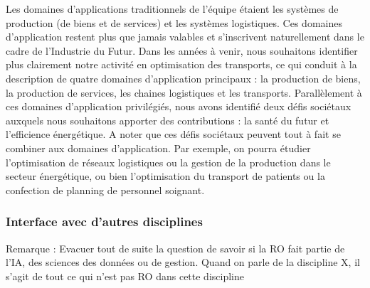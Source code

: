 	Les domaines d'applications traditionnels de l'équipe étaient les systèmes de production (de biens et de services) et les systèmes logistiques. 
	Ces domaines d'application restent plus que jamais valables et s'inscrivent naturellement dans le cadre de l'Industrie du Futur. 
	Dans les années à venir, nous souhaitons identifier plus clairement notre activité en optimisation des transports, ce qui conduit à la description de quatre domaines d'application principaux : la production de biens, la production de services, les chaines logistiques et les transports. Parallèlement à ces domaines d'application privilégiés, nous avons identifié deux défis sociétaux auxquels nous souhaitons apporter des contributions : la santé du futur et l'efficience énergétique. A noter que ces défis sociétaux peuvent tout à fait se combiner aux domaines d'application. Par exemple, on pourra étudier l'optimisation de réseaux logistiques ou la gestion de la production dans le secteur énergétique, ou bien l'optimisation du transport de patients ou la confection de planning de personnel soignant. 
	
	
	\subsubsection*{Interface avec d'autres disciplines}
	
	\textcolor{bleu}{Remarque : Evacuer tout de suite la question de savoir si la RO fait partie de l'IA, des sciences des données ou de gestion. Quand on parle de la discipline X, il s'agit de tout ce qui n'est pas RO dans cette discipline}
	
